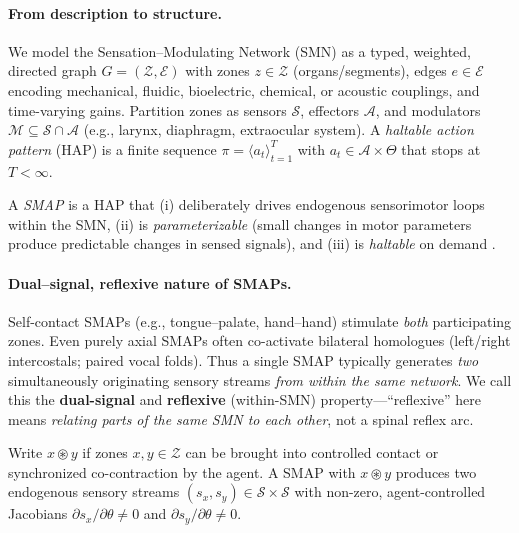 \paragraph{From description to structure.}
We model the Sensation–Modulating Network (SMN) as a typed, weighted, directed graph $G=(\mathcal{Z},\mathcal{E})$ with zones $z\in\mathcal{Z}$ (organs/segments), edges $e\in\mathcal{E}$ encoding mechanical, fluidic, bioelectric, chemical, or acoustic couplings, and time-varying gains. Partition zones as sensors $\mathcal{S}$, effectors $\mathcal{A}$, and modulators $\mathcal{M}\subseteq \mathcal{S}\cap\mathcal{A}$ (e.g., larynx, diaphragm, extraocular system). A \emph{haltable action pattern} (HAP) is a finite sequence $\pi=\langle a_t\rangle_{t=1}^{T}$ with $a_t\in\mathcal{A}\times\Theta$ that stops at $T<\infty$.

\begin{definition}
A \emph{SMAP} is a HAP that (i) deliberately drives endogenous sensorimotor loops within the SMN, (ii) is \emph{parameterizable} (small changes in motor parameters produce predictable changes in sensed signals), and (iii) is \emph{haltable} on demand \citep{PezzuloCisek2016AffordanceLandscape,TodorovJordan2002OFC}.
\end{definition}

\paragraph{Dual–signal, reflexive nature of SMAPs.}
Self-contact SMAPs (e.g., tongue–palate, hand–hand) stimulate \emph{both} participating zones. Even purely axial SMAPs often co-activate bilateral homologues (left/right intercostals; paired vocal folds). Thus a single SMAP typically generates \emph{two} simultaneously originating sensory streams \emph{from within the same network}. We call this the \textbf{dual-signal} and \textbf{reflexive} (within-SMN) property—“reflexive” here means \emph{relating parts of the same SMN to each other}, not a spinal reflex arc.

\begin{definition}
Write $x \circledast y$ if zones $x,y\in\mathcal{Z}$ can be brought into controlled contact or synchronized co-contraction by the agent. A SMAP with $x \circledast y$ produces two endogenous sensory streams $(s_x,s_y)\in\mathcal{S}\times\mathcal{S}$ with non-zero, agent-controlled Jacobians $\partial s_x/\partial\theta\neq 0$ and $\partial s_y/\partial\theta\neq 0$.
\end{definition}

